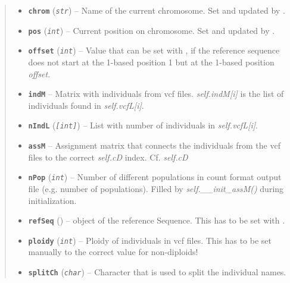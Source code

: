 \documentclass[letterpaper,10pt,english]{sphinxmanual}
\begin{document}
\begin{fulllineitems}
\begin{quote}
\begin{description}
\begin{itemize}
\item {} 
\textbf{\texttt{chrom}} (\emph{\texttt{str}}) -- Name of the current chromosome. Set and updated
by {\hyperref[cf:libPoMo.cf.CFWriter.write_Rn]{}}.

\item {} 
\textbf{\texttt{pos}} (\emph{\texttt{int}}) -- Current position on chromosome. Set and updated by
{\hyperref[cf:libPoMo.cf.CFWriter.write_Rn]{}}.

\item {} 
\textbf{\texttt{offset}} (\emph{\texttt{int}}) -- Value that can be set with {\hyperref[cf:libPoMo.cf.CFWriter.set_offset]{}},
if the reference sequence does not start at the
1-based position 1 but at the 1-based position
\emph{offset}.

\item {} 
\textbf{\texttt{indM}} -- Matrix with individuals from vcf files. \emph{self.indM{[}i{]}}
is the list of individuals found in \emph{self.vcfL{[}i{]}}.

\item {} 
\textbf{\texttt{nIndL}} (\emph{\texttt{{[}int{]}}}) -- List with number of individuals in
\emph{self.vcfL{[}i{]}}.

\item {} 
\textbf{\texttt{assM}} -- Assignment matrix that connects the individuals from
the vcf files to the correct \emph{self.cD} index.  Cf. \emph{self.cD}

\item {} 
\textbf{\texttt{nPop}} (\emph{\texttt{int}}) -- Number of different populations in count format
output file (e.g. number of populations).  Filled by
\emph{self.\_\_init\_assM()} during initialization.

\item {} 
\textbf{\texttt{refSeq}} ({\hyperref[seqbase:libPoMo.seqbase.Seq]{}}) -- {\hyperref[seqbase:libPoMo.seqbase.Seq]{}} object of the
reference Sequence. This has to be set with {\hyperref[cf:libPoMo.cf.CFWriter.set_seq]{}}.

\item {} 
\textbf{\texttt{ploidy}} (\emph{\texttt{int}}) -- Ploidy of individuals in vcf files.  This has to
be set manually to the correct value for non-diploids!

\item {} 
\textbf{\texttt{splitCh}} (\emph{\texttt{char}}) -- Character that is used to split the
individual names.


\end{itemize}
\end{description}
\end{quote}
\end{fulllineitems}
\end{document}
